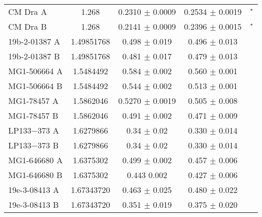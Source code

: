 \documentclass[fleqn,usenatbib]{mnras}
\begin{document}
\begin{table*}
\begin{center}
\begin{tabular}{lcccc}
CM Dra A & 1.268 & 0.2310 $\pm$ 0.0009 & 0.2534 $\pm$ 0.0019 & \cite{Southworth15}$^{\rm *}$ \\ %
CM Dra B & 1.268 & 0.2141 $\pm$ 0.0009 & 0.2396 $\pm$ 0.0015 & \cite{Southworth15}$^{\rm *}$ \\ %
19b-2-01387 A & 1.49851768 & 0.498 $\pm$ 0.019 & 0.496 $\pm$ 0.013 & \cite{Birkby12} \\ %
19b-2-01387 B & 1.49851768 & 0.481 $\pm$ 0.017 & 0.479 $\pm$ 0.013 & \cite{Birkby12} \\ %
MG1-506664 A & 1.5484492 & 0.584 $\pm$ 0.002 & 0.560 $\pm$ 0.001 & \cite{Kraus11} \\ %
MG1-506664 B & 1.5484492 & 0.544 $\pm$ 0.002 & 0.513 $\pm$ 0.001 & \cite{Kraus11} \\ %
MG1-78457 A & 1.5862046 & 0.5270 $\pm$ 0.0019 & 0.505 $\pm$ 0.008 & \cite{Kraus11} \\ %
MG1-78457 B & 1.5862046 & 0.491 $\pm$ 0.002 & 0.471 $\pm$ 0.009 & \cite{Kraus11} \\ %
LP133−373 A & 1.6279866 & 0.34 $\pm$ 0.02 & 0.330 $\pm$ 0.014 & \cite{Vaccaro07} \\ %
LP133−373 B & 1.6279866 & 0.34 $\pm$ 0.02 & 0.330 $\pm$ 0.014 & \cite{Vaccaro07} \\ %
MG1-646680 A & 1.6375302 & 0.499 $\pm$ 0.002 & 0.457 $\pm$ 0.006 & \cite{Kraus11} \\ %
MG1-646680 B & 1.6375302 & 0.443	0.002 & 0.427 $\pm$ 0.006 & \cite{Kraus11} \\ %
19e-3-08413 A & 1.67343720 & 0.463 $\pm$ 0.025 & 0.480 $\pm$ 0.022 & \cite{Birkby12} \\ %
19e-3-08413 B & 1.67343720 & 0.351 $\pm$ 0.019 & 0.375 $\pm$ 0.020 & \cite{Birkby12} \\ %

\end{tabular}
\end{center}
\end{table*}
\end{document}
